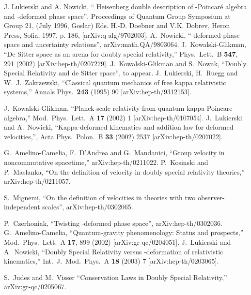 \documentclass  [12pt] {article}
\begin{document}
\begin{thebibliography}{99}
 J. Lukierski and A. Nowicki, `` Heisenberg double description of \myHighlight{$\kappa$}\coordHE{}-Poincar\'e
 algebra and \myHighlight{$\kappa$}\coordHE{}-deformed phase space'', Proceedings of
Quantum Group Symposium at Group 21, (July 1996, Goslar) Eds. H.-D. Doebner and
V.K. Dobrev, Heron Press, Sofia, 1997, p. 186, [arXiv:q-alg/9702003].
  A.~Nowicki, ``\myHighlight{$\kappa$}\coordHE{}-deformed phase space and uncertainty relations'',  arXiv:math.QA/9803064.
J.~Kowalski-Glikman, ``De Sitter space as an arena for doubly special
relativity,'' Phys.\ Lett.\ B {\bf 547}, 291 (2002) [arXiv:hep-th/0207279].
 J.~Kowalski-Glikman and S.~Nowak, ``Doubly Special Relativity  and de Sitter space'', to appear. %
J.~Lukierski, H.~Ruegg and W.~J.~Zakrzewski, ``Classical quantum mechanics of
free kappa relativistic systems,'' Annals Phys.\  {\bf 243} (1995) 90
[arXiv:hep-th/9312153].


J.~Kowalski-Glikman, ``Planck-scale relativity from quantum kappa-Poincare
algebra,'' Mod.\ Phys.\ Lett.\ A {\bf 17} (2002) 1 [arXiv:hep-th/0107054].
J.~Lukierski and A.~Nowicki, ``Kappa-deformed kinematics and addition law for
deformed velocities,'', Acta Phys.\ Polon.\ B {\bf 33} (2002) 2537
[arXiv:hep-th/0207022].

G.~Amelino-Camelia, F.~D'Andrea and G.~Mandanici, ``Group velocity in
noncommutative spacetime,'' arXiv:hep-th/0211022.
P.~Kosinski and P.~Maslanka, ``On the definition of velocity in doubly special
relativity theories,'' arXiv:hep-th/0211057.

 S.~Mignemi, ``On the definition of velocities in theories with two observer-independent scales'',
arXiv:hep-th/0302065.

 P.~Czerhoniak, ``Twisting \myHighlight{$\kappa$}\coordHE{}-deformed phase space'', arXiv:hep-th/0302036.
G.~Amelino-Camelia, ``Quantum-gravity phenomenology: Status and prospects,''
Mod.\ Phys.\ Lett.\ A {\bf 17}, 899 (2002) [arXiv:gr-qc/0204051].
J.~Lukierski and A.~Nowicki, ``Doubly Special Relativity versus
\myHighlight{$\kappa$}\coordHE{}-deformation of relativistic kinematics,'' Int.\ J.\ Mod.\ Phys.\ A
{\bf 18} (2003) 7 [arXiv:hep-th/0203065].


S.~Judes and M.~Visser ``Conservation Laws in Doubly Special Relativity,''
arXiv:gr-qc/0205067.

\end{thebibliography}
\end{document}
